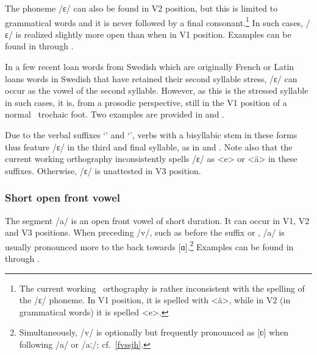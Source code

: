 The phoneme /ɛ/ can also be found in V2 position, but this is limited to grammatical words and it is never followed by a final consonant.\footnote{The current working \PS\ orthography is rather inconsistent with the spelling of the /ɛ/ phoneme. In V1 position, it is spelled with <ä>, while in V2 (in grammatical words) it is spelled <e>.} %
In such cases, /ɛ/ is realized slightly more open than when in V1 position. Examples can be found in  through .

In a few recent loan words from Swedish which are originally French or Latin loans words in Swedish that have retained their second syllable stress, /ɛ/ can occur as the vowel of the second syllable. However, as this is the stressed syllable in such cases, it is, from a prosodic perspective, still in the V1 position of a normal \PS\ trochaic foot. Two examples are provided in  and .

Due to the verbal suffixes  ‘’ and  ‘’, verbs with a bisyllabic stem in these forms thus feature /ɛ/ in the third and final syllable, as in  and . 
Note also that the current working orthography inconsistently spells /ɛ/ as <e> or <ä> in these suffixes. 
Otherwise, /ɛ/ is unattested in V3 position.



\subsubsection{Short open front vowel}
The segment /a/ is an open front vowel of short duration. It can occur in V1, V2 and V3 positions. When preceding /v/, such as before the suffix   or  , /a/ is usually pronounced more to the back towards [ɑ].\footnote{Simultaneously, /v/ is optionally but frequently pronounced as [ʋ] when following /a/ or /aː/; cf.~\SEC\ref{fvssjh}.} 
Examples can be found in  through .

